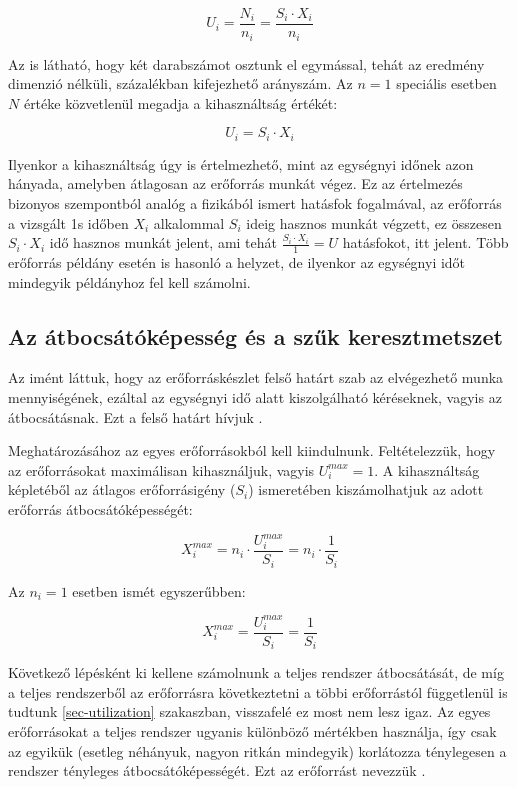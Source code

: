 $$U_i = \frac{N_i}{n_i} = \frac{S_i \cdot X_i}{n_i}$$

Az is látható, hogy két darabszámot osztunk el egymással, tehát az eredmény dimenzió nélküli, százalékban kifejezhető arányszám. Az $n = 1$ speciális esetben $N$ értéke közvetlenül megadja a kihasználtság értékét:

$$U_i = S_i \cdot X_i$$

Ilyenkor a kihasználtság úgy is értelmezhető, mint az egységnyi időnek azon hányada, amelyben átlagosan az erőforrás munkát végez. Ez az értelmezés bizonyos szempontból analóg a fizikából ismert hatásfok fogalmával, az erőforrás a vizsgált 1s időben $X_i$ alkalommal $S_i$ ideig hasznos munkát végzett, ez összesen $S_i \cdot X_i$ idő hasznos munkát jelent, ami tehát $\frac{S_i \cdot X_i}{1} = U$ hatásfokot, itt  jelent. Több erőforrás példány esetén is hasonló a helyzet, de ilyenkor az egységnyi időt mindegyik példányhoz fel kell számolni.

\subsection{Az átbocsátóképesség és a szűk keresztmetszet}

Az imént láttuk, hogy az erőforráskészlet felső határt szab az elvégezhető munka mennyiségének, ezáltal az egységnyi idő alatt kiszolgálható kéréseknek, vagyis az átbocsátásnak. Ezt a felső határt hívjuk .

Meghatározásához az egyes erőforrásokból kell kiindulnunk. Feltételezzük, hogy az erőforrásokat maximálisan kihasználjuk, vagyis $U_i^{max} = 1$. A kihasználtság képletéből az átlagos erőforrásigény ($S_i$) ismeretében kiszámolhatjuk az adott erőforrás átbocsátóképességét:

$$X_i^{max} = n_i \cdot \frac{U_i^{max}}{S_i} = n_i \cdot \frac{1}{S_i}$$

Az $n_i=1$ esetben ismét egyszerűbben:

$$X_i^{max} = \frac{U_i^{max}}{S_i} = \frac{1}{S_i}$$

Következő lépésként ki kellene számolnunk a teljes rendszer átbocsátását, de míg a teljes rendszerből az erőforrásra következtetni a többi erőforrástól függetlenül is tudtunk \az\autoref{sec-utilization} szakaszban, visszafelé ez most nem lesz igaz. Az egyes erőforrásokat a teljes rendszer ugyanis különböző mértékben használja, így csak az egyikük (esetleg néhányuk, nagyon ritkán mindegyik) korlátozza ténylegesen a rendszer tényleges átbocsátóképességét. Ezt az erőforrást nevezzük .

